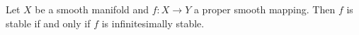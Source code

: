 Let $X$ be a smooth manifold and $f: X \to Y$ a proper smooth mapping. Then $f$ is stable if and only if $f$ is infinitesimally stable.
